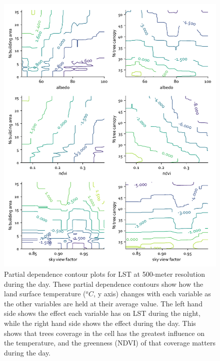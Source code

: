 \documentclass[final,3p,times,twocolumn,sort&compress]{elsarticle}
\begin{document}
\begin{figure}[h]
    \centering
    \includegraphics[width=\linewidth]{fig/report/pdp_2d_day_500.pdf}
    \caption[Partial dependence contour plots for LST at 500-meter resolution during the day]{
    Partial dependence contour plots for LST at 500-meter resolution during the day.
    These partial dependence contours show how the land surface temperature ($^oC$, y axis) changes with each variable as the other variables are held at their average value. The left hand side shows the effect each variable has on LST during the night, while the right hand side shows the effect during the day. This shows that trees coverage in the cell has the greatest influence on the temperature, and the greenness (NDVI) of that coverage matters during the day.
    }
    \label{fig:pdp_2dday_500}
\end{figure}


\clearpage
\end{document}
